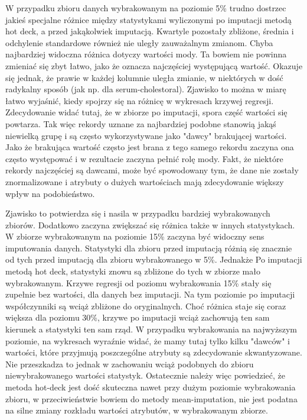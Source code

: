 \documentclass{classrep}
\begin{document}
{{            W przypadku zbioru danych wybrakowanym na poziomie 5\% trudno dostrzec
            jakieś specjalne różnice między statystykami wyliczonymi po imputacji
            metodą hot deck, a przed jakąkolwiek imputacją. Kwartyle pozostały
            zbliżone, średnia i odchylenie standardowe również nie uległy zauważalnym
            zmianom. Chyba najbardziej widoczna różnica dotyczy wartości mody. Ta
            bowiem nie powinna zmieniać się zbyt łatwo, jako że oznacza najczęściej
            występującą wartość. Okazuje się jednak, że prawie w każdej kolumnie uległa
            zmianie, w niektórych w dość radykalny sposób (jak np. dla
            serum-cholestoral). Zjawisko to można w miarę łatwo wyjaśnić, kiedy spojrzy
            się na różnicę w wykresach krzywej regresji. Zdecydowanie widać tutaj, że w
            zbiorze po imputacji, spora część wartości się powtarza. Tak więc rekordy
            uznane za najbardziej podobne stanowią jakąś niewielką grupę i są często
            wykorzystywane jako "dawcy" brakującej wartości. Jako że brakująca wartość
            często jest brana z tego samego rekordu zaczyna ona często występować i w
            rezultacie zaczyna pełnić rolę mody. Fakt, że niektóre rekordy najczęściej
            są dawcami, może być spowodowany tym, że dane nie zostały znormalizowane i
            atrybuty o dużych wartościach mają zdecydowanie większy wpływ na podobieństwo.

            Zjawisko to potwierdza się i nasila w przypadku bardziej wybrakowanych
            zbiorów. Dodatkowo zaczyna zwiększać się różnica także w innych
            statystykach. W zbiorze wybrakowanym na poziomie 15\% zaczyna być widoczny
            sens imputowania danych. Statystyki dla zbioru przed imputacją różnią się
            znacznie od tych przed imputacją dla zbioru wybrakowanego w 5\%. Jednakże
            Po imputacji metodą hot deck, statystyki znowu są zbliżone do tych w
            zbiorze mało wybrakowanym. Krzywe regresji od poziomu wybrakowania 15\%
            stały się zupełnie bez wartości, dla danych bez imputacji. Na tym poziomie
            po imputacji współczynniki są wciąż zbliżone do oryginalnych. Choć różnica
            staje się coraz większa dla poziomu 30\%, krzywe po imputacji wciąż
            zachowują ten sam kierunek a statystyki ten sam rząd. W przypadku
            wybrakowania na najwyższym poziomie, na wykresach wyraźnie widać, że mamy
            tutaj tylko kilku "dawców" i wartości, które przyjmują poszczególne
            atrybuty są zdecydowanie skwantyzowane. Nie przeszkadza to jednak w
            zachowaniu wciąż podobnych do zbioru niewybrakowanego wartości statystyk.
            Ostatecznie należy więc powiedzieć, że metoda hot-deck jest dość skuteczna
            nawet przy dużym poziomie wybrakowania zbioru, w przeciwieństwie bowiem do
            metody mean-imputation, nie jest podatna na silne zmiany rozkładu wartości
            atrybutów, w wybrakowanym zbiorze.

}}
\end{document}
